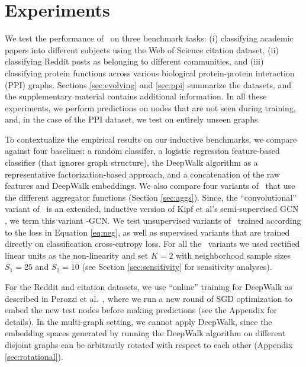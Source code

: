 
\section{Experiments}
\label{sec:exp}

We test the performance of \name\ on three benchmark tasks: (i) classifying academic papers into different subjects using the Web of Science
citation dataset, (ii) classifying Reddit posts as belonging to different communities, and (iii) classifying protein functions across various biological protein-protein interaction (PPI) graphs. Sections \ref{sec:evolving} and \ref{sec:ppi} summarize the datasets, and the supplementary material contains additional information.
In all these experiments, we perform predictions on nodes that are not seen during training, and, in the case of the PPI dataset, we test on entirely unseen graphs. 

To contextualize the empirical results on our inductive benchmarks, we compare against four baselines: 
a random classifer, a logistic regression feature-based classifier (that ignores graph structure), the DeepWalk algorithm \cite{perozzi2014deepwalk} as a representative factorization-based approach, and a
concatenation of the raw features and DeepWalk embeddings.
We also compare four variants of \name\ that use the different aggregator functions (Section \ref{sec:aggs}).
Since, the ``convolutional'' variant of \name\ is an extended, inductive version of Kipf et al's semi-supervised GCN \cite{kipf2016semi}, we term this variant \name-GCN.
We test unsupervised variants of \name\, trained according to the loss in Equation \eqref{eq:neg}, as well as supervised variants that are trained directly on classification cross-entropy loss.
For all the \name\ variants we used rectified linear units as the non-linearity and set $K=2$ with neighborhood sample sizes $S_1=25$ and $S_2=10$ (see Section \ref{sec:sensitivity} for sensitivity analyses).

For the Reddit and citation datasets, we use ``online'' training for DeepWalk as described in Perozzi et al.~\cite{perozzi2014deepwalk}, where we run a new round of SGD optimization to embed the new test nodes before making predictions (see the Appendix for details).
In the multi-graph setting, we cannot apply DeepWalk, since the embedding spaces generated by running the DeepWalk algorithm on different disjoint graphs can be arbitrarily rotated with respect to each other (Appendix \ref{sec:rotational}). 



